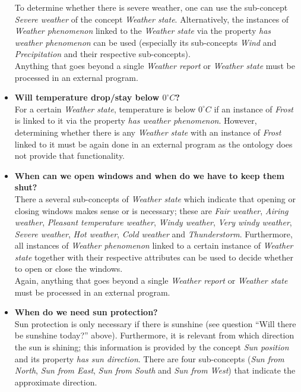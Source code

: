 \begin{itemize}
    To determine whether there is severe weather, one can use the sub-concept \emph{Severe weather} of the concept \emph{Weather state}. Alternatively, the instances of \emph{Weather phenomenon} linked to the \emph{Weather state} via the property \emph{has weather phenomenon} can be used (especially its sub-concepts \emph{Wind} and \emph{Precipitation} and their respective sub-concepts).\\
    Anything that goes beyond a single \emph{Weather report} or \emph{Weather state} must be processed in an external program.
  \item \textbf{Will temperature drop/stay below $0^\circ C$?}\\
    For a certain \emph{Weather state}, temperature is below $0^\circ C$ if an instance of \emph{Frost} is linked to it via the property \emph{has weather phenomenon}. However, determining whether there is any \emph{Weather state} with an instance of \emph{Frost} linked to it must be again done in an external program as the \thinkhomeweather ontology does not provide that functionality.
  \item \textbf{When can we open windows and when do we have to keep them shut?}\\ %
    There a several sub-concepts of \emph{Weather state} which indicate that opening or closing windows makes sense or is necessary; these are \emph{Fair weather}, \emph{Airing weather}, \emph{Pleasant temperature weather}, \emph{Windy weather}, \emph{Very windy weather}, \emph{Severe weather}, \emph{Hot weather}, \emph{Cold weather} and \emph{Thunderstorm}. Furthermore, all instances of \emph{Weather phenomenon} linked to a certain instance of \emph{Weather state} together with their respective attributes can be used to decide whether to open or close the windows.\\
    Again, anything that goes beyond a single \emph{Weather report} or \emph{Weather state} must be processed in an external program.
  \item \textbf{When do we need sun protection?}\\
    Sun protection is only necessary if there is sunshine (see question ``Will there be sunshine today?'' above). Furthermore, it is relevant from which direction the sun is shining; this information is provided by the concept \emph{Sun position} and its property \emph{has sun direction}. There are four sub-concepts (\emph{Sun from North}, \emph{Sun from East}, \emph{Sun from South} and \emph{Sun from West}) that indicate the approximate direction.\\

\end{itemize}
